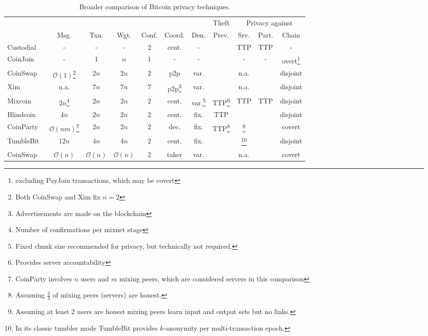 \documentclass[a4paper]{article}
\renewcommand*{\thefootnote}{\arabic{footnote}}
\newcommand{\cmark}{\ding{51}}%
\newcommand{\xmark}{\ding{55}}%
\begin{document}
\begin{table}[h!]
\begin{minipage}{\textwidth}
\renewcommand{\thempfootnote}{\fnsymbol{mpfootnote}}
\renewcommand{\thefootnote}{\thempfootnote} %
\centering
\begin{tabular}{lcccccccccc}
	&&&&&&& Theft & \multicolumn{3}{c}{Privacy against} \\
	&Msg. & Txn. & Wgt. & Conf. & Coord. & Den. & Prev. & Srv. & Part. & Chain \\

	Custodial & - & - & - & 2 & cent. & - & \xmark & TTP & TTP & - \\
	CoinJoin~\cite{maxwell2013coinjoin} & - & 1 & $n$ & 1 & - & - & \cmark & - & - & overt\footnote{excluding PayJoin transactions, which may be covert} \\
	CoinSwap~\cite{maxwell2013coinswap} & $\mathcal{O}(1)$\footnote{Both CoinSwap and Xim fix $n=2$} & $2n$\footnotemark[\value{footnote}] & $2n$\footnotemark[\value{footnote}] & $2$ & p2p & var. & \cmark & n.a. & \xmark & disjoint \\
	Xim~\cite{bissias2014sybil} & n.a. & $7n$\footnotemark[\value{footnote}] & $7n$\footnotemark[\value{footnote}] & $7$ &  p2p\footnote{Advertisements are made on the blockchain} & var. & \cmark & n.a. & \xmark & disjoint \\
	Mixcoin~\cite{bonneau2014mixcoin} & $2n$\footnote{Number of confirmations per mixnet stage} & $2n$\footnotemark[\value{footnote}] & $2n$\footnotemark[\value{footnote}] & $2$\footnotemark[\value{footnote}] & cent. & var.\footnote{Fixed chunk size recommended for privacy, but technically not required.} & TTP\footnote{Provides server accountability} & TTP & TTP & disjoint \\
	Blindcoin~\cite{valenta2015blindcoin} & $4n$ & $2n$ & $2n$ & $2$ & cent. & fix. & TTP\footnotemark[\value{footnote}] & \cmark & \cmark & disjoint \\
	CoinParty~\cite{ziegeldorf2015coinparty}& $\mathcal{O}(n m)$\footnote{CoinParty involves $n$ users and $m$ mixing peers, which are considered servers in this comparison} & $2n$ & $2n$ & 2 & dec.\footnotemark[\value{footnote}] & fix. & TTP\footnote{Assuming $\frac{2}{3}$ of mixing peers (servers) are honest.} & \cmark\footnote{Assuming at least 2 users are honest mixing peers learn input and output sets but no links.} & \cmark & covert \\
	TumbleBit~\cite{heilman2017tumblebit} & $12n$ & $4n$ & $4n$ & $2$ & cent. & fix. & \cmark & \cmark\footnote{In its classic tumbler mode TumbleBit provides $k$-anonymity per multi-transaction epoch.} & \cmark & disjoint \\
	CoinSwap\cite{belcher2020design} & $\mathcal{O}(n)$ & $\mathcal{O}(n)$ & $\mathcal{O}(n)$ & 2 & taker & var. & \cmark & n.a. & \cmark & covert \\
\end{tabular}
\end{minipage}
\caption{Broader comparison of Bitcoin privacy techniques.}
\label{table:noncoinjoin}
\end{table}
\end{document}
